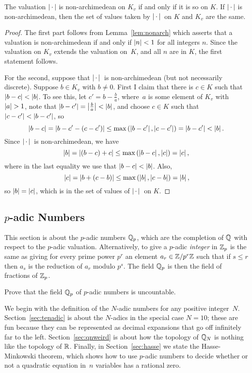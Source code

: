 \begin{corollary}\label{cor:valna}
The valuation $\left|\,\cdot\,\right|$ is non-archimedean
on $K_v$ if and only if it is so on $K$.  If $\left|\,\cdot\,\right|$ is
non-archimedean, then the set of values taken by $\left|\,\cdot\,\right|{}$ on $K$
and $K_v$ are the same.
\end{corollary}
\begin{proof}
  The first part follows from Lemma~\ref{lem:nonarch} which asserts
  that a valuation is non-archimedean if and only if $\left|n\right|<1$ for
  all integers $n$.  Since the valuation on $K_v$ extends the
  valuation on~$K$, and all $n$ are in $K$, the first statement
  follows.

For the second, suppose that $\left|\,\cdot\,\right|{}$ is non-archimedean (but
not necessarily discrete).
Suppose $b\in K_v$ with $b\neq 0$. 
First I claim that there is $c\in K$ such that $\left|b-c\right| < \left|b\right|$.
To see this, let $c'=b-\frac{b}{a}$, where~$a$ is some 
element of $K_v$ with $\abs{a}>1$, note that
$\left|b-c'\right|=\left|\frac{b}{a}\right|<\left|b\right|$, and choose $c\in K$ such
that $\left|c-c'\right| < \left|b-c'\right|$, so 
$$\left|b-c\right| = \left|b-c' - (c-c')\right|
 \leq \max\left(\left|b-c'\right|,\left|c-c'\right|\right) = \left|b-c'\right|<\left|b\right|.
$$
Since $\left|\,\cdot\,\right|{}$ is non-archimedean,
we have
$$
  \left|b\right| = \left|(b-c)+c\right| \leq \max\left(\left|b-c\right|,\left|c\right|\right) = \left|c\right|,
$$
where in the last equality we use that $\left|b-c\right|<\left|b\right|$.
Also,
$$
  \left|c\right| = \left|b + (c-b)\right| \leq \max\left(\left|b\right|,\left|c-b\right|\right) = \left|b\right|,
$$
so $\left|b\right| = \left|c\right|$, which is in the set of values of $\left|\,\cdot\,\right|{}$
on $K$.
\end{proof}

\subsection{$p$-adic Numbers}
This section is about the $p$-adic numbers $\mathbb{Q}_p$, which are the
completion of $\mathbb{Q}$ with respect to the $p$-adic valuation.
Alternatively, to give a $p$-adic {\em integer} in $\mathbb{Z}_p$ is the same
as giving for every prime power $p^r$ an element $a_r\in \mathbb{Z}/p^r\mathbb{Z}$
such that if $s\leq r$ then $a_s$ is the reduction of $a_r$ modulo
$p^s$.  The field $\mathbb{Q}_p$ is then the field of fractions of $\mathbb{Z}_p$.

\begin{exercise} \label{ex:topology2}
Prove that the field $\mathbb{Q}_p$ of $p$-adic numbers is uncountable.
\end{exercise} 


We begin with the definition of the $N$-adic numbers for any positive
integer~$N$.  Section~\ref{sec:tenadic} is about the $N$-adics in the
special case $N=10$; these are fun because they can be represented as
decimal expansions that go off infinitely far to the left.
Section~\ref{sec:qnweird} is about how the topology of $\mathbb{Q}_N$ is
nothing like the topology of $\mathbb{R}$.  Finally, in
Section~\ref{sec:hasse} we state the Hasse-Minkowski theorem, which
shows how to use $p$-adic numbers to decide whether or not a quadratic
equation in~$n$ variables has a rational zero.

